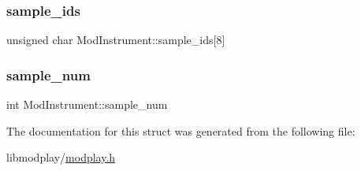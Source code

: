 \subsubsection{\texorpdfstring{sample\+\_\+ids}{sample\_ids}}
{\footnotesize\ttfamily unsigned char Mod\+Instrument\+::sample\+\_\+ids\mbox{[}8\mbox{]}}

\mbox{\label{structModInstrument_a573f5fd3a0901038aa7cf4594429a0ca}} 
\subsubsection{\texorpdfstring{sample\+\_\+num}{sample\_num}}
{\footnotesize\ttfamily int Mod\+Instrument\+::sample\+\_\+num}



The documentation for this struct was generated from the following file\+:\begin{DoxyCompactItemize}
\item 
libmodplay/\hyperlink{modplay_8h}{modplay.\+h}\end{DoxyCompactItemize}

